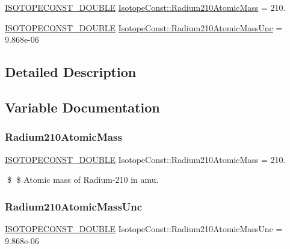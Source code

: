 \begin{DoxyCompactItemize}
\item 
\mbox{\hyperlink{group___isotope_const-_macros_ga8f45a7272ce02c0b4c65c44636ed719a}{I\+S\+O\+T\+O\+P\+E\+C\+O\+N\+S\+T\+\_\+\+D\+O\+U\+B\+LE}} \mbox{\hyperlink{group___isotope_const-_radium-_ra210_ga3193579f7b7803e807dc70caa5571a10}{Isotope\+Const\+::\+Radium210\+Atomic\+Mass}} = 210.
\item 
\mbox{\hyperlink{group___isotope_const-_macros_ga8f45a7272ce02c0b4c65c44636ed719a}{I\+S\+O\+T\+O\+P\+E\+C\+O\+N\+S\+T\+\_\+\+D\+O\+U\+B\+LE}} \mbox{\hyperlink{group___isotope_const-_radium-_ra210_gaacdd3fffafe2bfa51901e7d9e26da47c}{Isotope\+Const\+::\+Radium210\+Atomic\+Mass\+Unc}} = 9.\+868e-\/06
\end{DoxyCompactItemize}


\subsection{Detailed Description}


\subsection{Variable Documentation}
\mbox{\label{group___isotope_const-_radium-_ra210_ga3193579f7b7803e807dc70caa5571a10}} 
\subsubsection{\texorpdfstring{Radium210\+Atomic\+Mass}{Radium210AtomicMass}}
{\footnotesize\ttfamily \mbox{\hyperlink{group___isotope_const-_macros_ga8f45a7272ce02c0b4c65c44636ed719a}{I\+S\+O\+T\+O\+P\+E\+C\+O\+N\+S\+T\+\_\+\+D\+O\+U\+B\+LE}} Isotope\+Const\+::\+Radium210\+Atomic\+Mass = 210.}

\$ \$ Atomic mass of Radium-\/210 in amu. \mbox{\label{group___isotope_const-_radium-_ra210_gaacdd3fffafe2bfa51901e7d9e26da47c}} 
\subsubsection{\texorpdfstring{Radium210\+Atomic\+Mass\+Unc}{Radium210AtomicMassUnc}}
{\footnotesize\ttfamily \mbox{\hyperlink{group___isotope_const-_macros_ga8f45a7272ce02c0b4c65c44636ed719a}{I\+S\+O\+T\+O\+P\+E\+C\+O\+N\+S\+T\+\_\+\+D\+O\+U\+B\+LE}} Isotope\+Const\+::\+Radium210\+Atomic\+Mass\+Unc = 9.\+868e-\/06}

